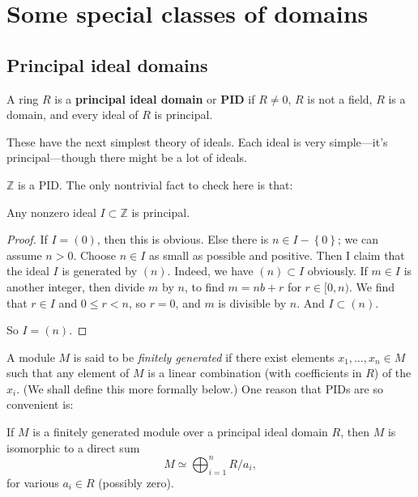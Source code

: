 \section{Some special classes of domains}

\subsection{Principal ideal domains}

\begin{definition} 
A ring $R$ is a \textbf{principal ideal domain} or \textbf{PID} if $R \neq 0$, $R$ is not a
field, $R$ is a domain, and every ideal of $R$ is principal.
\end{definition} 

These have the next simplest theory of ideals.
Each ideal is very simple---it's principal---though there might be a lot of ideals.

\begin{example} 
$\mathbb{Z}$ is a PID. The only nontrivial fact to check here is that:
\begin{proposition} 
Any nonzero ideal $I \subset \mathbb{Z}$ is principal.
\end{proposition} 
\begin{proof} 
If $I = (0)$, then this is obvious.  Else there is $n \in I -
\left\{0\right\}$; we can assume $n>0$.  Choose $n \in I$ as small as possible and
positive. Then  I claim that the ideal $I$ is generated by $(n)$. Indeed, we have $(n)
\subset I$ obviously. If $m \in I$ is another integer, then divide $m$ by $n$,
to find $m = nb + r$ for $r \in [0, n)$. We find that $r \in I$ and $0 \leq r <
n$, so $r=0$, and $m$ is divisible by $n$. And $I \subset (n)$. 

So $I = (n)$.
\end{proof} 
\end{example} 

A module $M$ is said to be \emph{finitely generated} if there exist elements
$x_1, \dots, x_n \in M$ such that any element of $M$ is a linear combination
(with coefficients in $R$) of the $x_i$. (We shall define this more formally
below.)
One reason that PIDs are so convenient is:

\begin{theorem} \label{structurePID} 
If $M$ is a finitely generated module over a principal ideal domain $R$, then
$M$ is isomorphic to a direct sum
\[ M \simeq \bigoplus_{i=1}^n R/a_i,  \]
for various $a_i \in R$ (possibly zero).
\end{theorem} 

